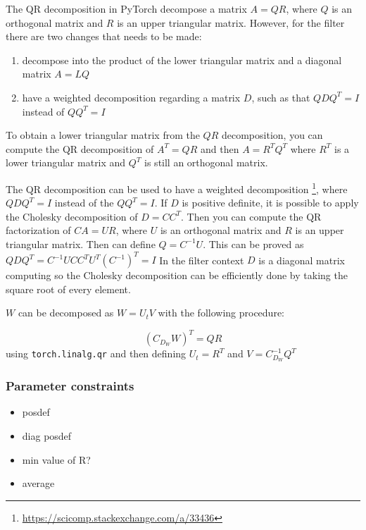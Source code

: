 \documentclass{article}
\newcounter{sssparagraph}
\begin{document}
The QR decomposition in PyTorch  decompose a matrix $A = QR$, where $Q$ is an orthogonal matrix and $R$ is an upper triangular matrix.
However, for the filter there are two changes that needs to be made:
\begin{enumerate}
    \item decompose into the product of the lower triangular matrix and a diagonal matrix $A = LQ$
    \item have a weighted decomposition regarding a matrix $D$, such as that $QDQ^T = I$ instead of $QQ^T = I$
\end{enumerate}


To obtain a lower triangular matrix from the $QR$ decomposition, you can compute the QR decomposition of $A^T=QR$ and then $A = R^TQ^T$ where $R^T$ is a lower triangular matrix and $Q^T$ is still an orthogonal matrix.


The QR decomposition can be used to have a weighted decomposition \footnote{\url{https://scicomp.stackexchange.com/a/33436}}, where $QDQ^T = I$ instead of the $QQ^T = I$.
If $D$ is positive definite, it is possible to apply the Cholesky decomposition of $D = CC^T$. Then you can compute the QR factorization of $CA=UR$, where $U$ is an orthogonal matrix and $R$ is an upper triangular matrix. Then can define $Q=C^{-1}U$. This can be proved as 
$Q D Q^T = C^{-1}U CC^TU^T(C^{-1})^T= I$
In the filter context $D$ is a diagonal matrix computing so the Cholesky decomposition can be efficiently done by taking the square root of every element.

 $W$ can be decomposed as $W=U_tV$ with the following procedure:

$$(C_{D_W}W)^T = QR$$ using \verb|torch.linalg.qr| and then defining $U_t = R^T$ and $V=C_{D_W}^{-1}Q^T$

\subsubsection{Parameter constraints}

\begin{itemize}
    \item posdef
    \item diag posdef 
\end{itemize}

\begin{itemize}
    \item min value of R?
    \item average 
\end{itemize}
\end{document}

